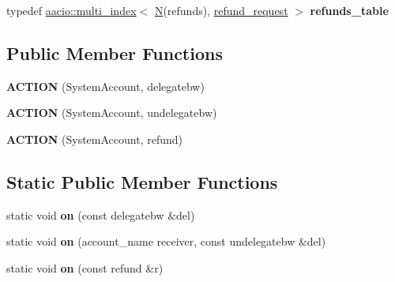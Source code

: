 \begin{DoxyCompactItemize}
\item 
\mbox{\label{classaaciosystem_1_1delegate__bandwidth_a53d1da670d2dd8376576a1af88718608}} 
typedef \mbox{\hyperlink{classaacio_1_1multi__index}{aacio\+::multi\+\_\+index}}$<$ \mbox{\hyperlink{group__types_gaf9c1edb0e0da55ec6ba09f32f6839529}{N}}(refunds), \mbox{\hyperlink{structaaciosystem_1_1delegate__bandwidth_1_1refund__request}{refund\+\_\+request}} $>$ {\bfseries refunds\+\_\+table}
\end{DoxyCompactItemize}
\subsection*{Public Member Functions}
\begin{DoxyCompactItemize}
\item 
\mbox{\label{classaaciosystem_1_1delegate__bandwidth_a0d7a41936e299a25d91e4fac1b0b313b}} 
{\bfseries A\+C\+T\+I\+ON} (System\+Account, delegatebw)
\item 
\mbox{\label{classaaciosystem_1_1delegate__bandwidth_adf7b438784e18f4b8b740ad467ce41da}} 
{\bfseries A\+C\+T\+I\+ON} (System\+Account, undelegatebw)
\item 
\mbox{\label{classaaciosystem_1_1delegate__bandwidth_a959fd809a123eb90435b48732cc511a5}} 
{\bfseries A\+C\+T\+I\+ON} (System\+Account, refund)
\end{DoxyCompactItemize}
\subsection*{Static Public Member Functions}
\begin{DoxyCompactItemize}
\item 
\mbox{\label{classaaciosystem_1_1delegate__bandwidth_a2100ccec4d11f1e59a80b87d3fd796d2}} 
static void {\bfseries on} (const delegatebw \&del)
\item 
\mbox{\label{classaaciosystem_1_1delegate__bandwidth_abc5aa903d93222a19fbf15d8c4fe996b}} 
static void {\bfseries on} (account\+\_\+name receiver, const undelegatebw \&del)
\item 
\mbox{\label{classaaciosystem_1_1delegate__bandwidth_a30daf50b833aac70dfb0616256daf7cd}} 
static void {\bfseries on} (const refund \&r)
\end{DoxyCompactItemize}
